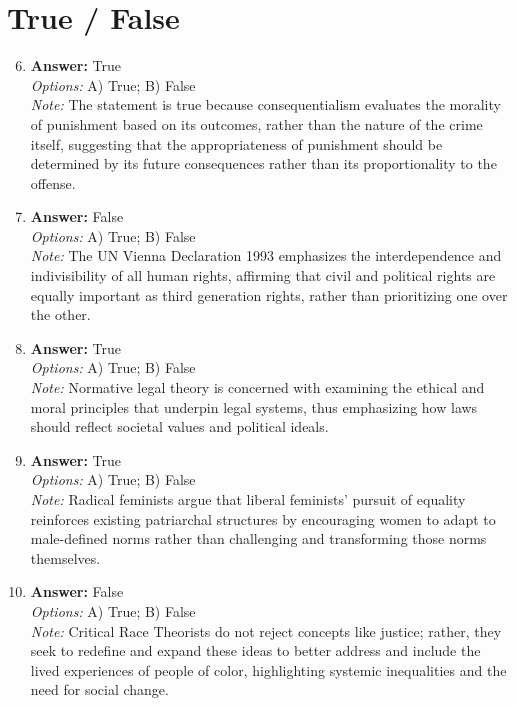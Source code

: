 \documentclass[12pt]{article}
\begin{document}
\section*{True / False}
\begin{enumerate}[label=\arabic*.]
\setcounter{enumi}{5}
\item \textbf{Answer:} True
\\ \textit{Options:} A) True; B) False
\\ \textit{Note:} The statement is true because consequentialism evaluates the morality of punishment based on its outcomes, rather than the nature of the crime itself, suggesting that the appropriateness of punishment should be determined by its future consequences rather than its proportionality to the offense.
\item \textbf{Answer:} False
\\ \textit{Options:} A) True; B) False
\\ \textit{Note:} The UN Vienna Declaration 1993 emphasizes the interdependence and indivisibility of all human rights, affirming that civil and political rights are equally important as third generation rights, rather than prioritizing one over the other.
\item \textbf{Answer:} True
\\ \textit{Options:} A) True; B) False
\\ \textit{Note:} Normative legal theory is concerned with examining the ethical and moral principles that underpin legal systems, thus emphasizing how laws should reflect societal values and political ideals.
\item \textbf{Answer:} True
\\ \textit{Options:} A) True; B) False
\\ \textit{Note:} Radical feminists argue that liberal feminists' pursuit of equality reinforces existing patriarchal structures by encouraging women to adapt to male-defined norms rather than challenging and transforming those norms themselves.
\item \textbf{Answer:} False
\\ \textit{Options:} A) True; B) False
\\ \textit{Note:} Critical Race Theorists do not reject concepts like justice; rather, they seek to redefine and expand these ideas to better address and include the lived experiences of people of color, highlighting systemic inequalities and the need for social change.
\end{enumerate}
\end{document}
